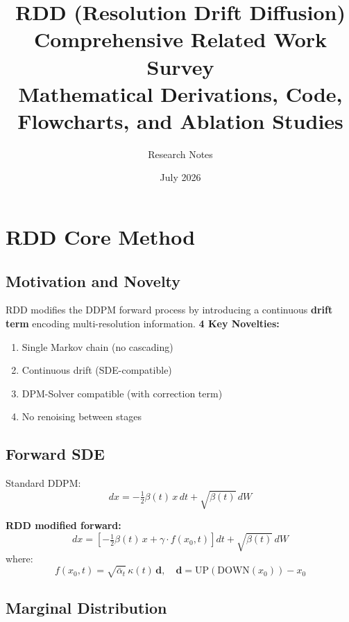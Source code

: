 \documentclass[11pt, a4paper]{article}
\title{\huge RDD (Resolution Drift Diffusion)\\[0.4em]
\Large Comprehensive Related Work Survey\\[0.2em]
\normalsize Mathematical Derivations, Code, Flowcharts, and Ablation Studies}
\author{Research Notes}
\date{July 2026}
\newcommand{\alphabar}{\bar{\alpha}}
\begin{document}
\maketitle
\tableofcontents
\newpage

\section{RDD Core Method}

\subsection{Motivation and Novelty}

RDD modifies the DDPM forward process by introducing a continuous \textbf{drift term} encoding multi-resolution information. \textbf{4 Key Novelties:}
\begin{enumerate}
    \item Single Markov chain (no cascading)
    \item Continuous drift (SDE-compatible)
    \item DPM-Solver compatible (with correction term)
    \item No renoising between stages
\end{enumerate}

\subsection{Forward SDE}

Standard DDPM:
\begin{equation}
    dx = -\tfrac{1}{2}\beta(t)\, x\, dt + \sqrt{\beta(t)}\, dW
\end{equation}

\textbf{RDD modified forward:}
\begin{equation}
    \boxed{dx = \left[-\tfrac{1}{2}\beta(t)\, x + \gamma \cdot f(x_0, t)\right] dt + \sqrt{\beta(t)}\, dW}
\end{equation}
where:
\begin{equation}
    f(x_0, t) = \sqrt{\alphabar_t}\, \kappa(t)\, \mathbf{d}, \quad \mathbf{d} = \mathrm{UP}(\mathrm{DOWN}(x_0)) - x_0
\end{equation}

\subsection{Marginal Distribution}
\end{document}
